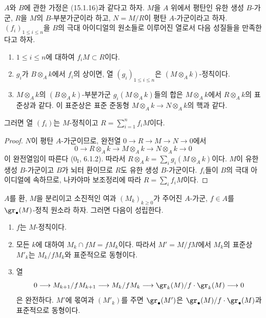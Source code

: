 \begin{corollary}[15.1.17]
\label{0.15.1.17-fr}
$A$와 $B$에 관한 가정은 (15.1.16)과 같다고 하자. $M$을 $A$ 위에서
평탄인 유한 생성 $B$-가군, $R$을 $M$의 $B$-부분가군이라 하고,
$N=M/R$이 평탄 $A$-가군이라고 하자. $(f_i)_{1\leq i\leq n}$을
$B$의 극대 아이디얼의 원소들로 이루어진 열로서 다음 성질들을
만족한다고 하자.
\begin{enumerate}
  \item[(i)] $1\leq i\leq n$에 대하여 $f_iM\subset R$이다.
  \item[(ii)] $g_i$가 $B\otimes_A k$에서 $f_i$의 상이면, 열
  $(g_i)_{1\leq i\leq n}$은 $(M\otimes_A k)$-정칙이다.
  \item[(iii)] $M\otimes_A k$의 $(B\otimes_A k)$-부분가군
  $g_i(M\otimes_A k)$들의 합은 $M\otimes_A k$에서
  $R\otimes_A k$의 표준상과 같다. 이 표준상은 표준 준동형
  $M\otimes_A k\to N\otimes_A k$의 핵과 같다.
\end{enumerate}
그러면 열 $(f_i)$는 $M$-정칙이고
$R=\sum_{i=1}^n f_iM$이다.
\end{corollary}

\begin{proof}
$N$이 평탄 $A$-가군이므로, 완전열 $0\to R\to M\to N\to0$에서
\[
  0\longrightarrow R\otimes_A k\longrightarrow M\otimes_A k
  \longrightarrow N\otimes_A k\longrightarrow0
\]
이 완전열임이 따른다 ($0_{\mathrm I}$, 6.1.2). 따라서
$R\otimes_A k=\sum_i g_i(M\otimes_A k)$이다. $M$이 유한 생성
$B$-가군이고 $B$가 뇌터 환이므로 $R$도 유한 생성 $B$-가군이다.
$f_i$들이 $B$의 극대 아이디얼에 속하므로, 나카야마 보조정리에 따라
$R=\sum_i f_iM$이다.
\end{proof}

\begin{lemma}[15.1.18]
\label{0.15.1.18-fr}
$A$를 환, $M$을 분리이고 소진적인 여과 $(M_k)_{k\geq0}$가 주어진
$A$-가군, $f\in A$를 $\gr_\bullet(M)$-정칙 원소라 하자. 그러면
다음이 성립한다.
\begin{enumerate}
  \item[(i)] $f$는 $M$-정칙이다.
  \item[(ii)] 모든 $k$에 대하여 $M_k\cap fM=fM_k$이다. 따라서
  $M'=M/fM$에서 $M_k$의 표준상 $M'_k$는 $M_k/fM_k$와 표준적으로
  동형이다.
  \item[(iii)] 열
  \[
    0\longrightarrow M_{k+1}/fM_{k+1}\longrightarrow M_k/fM_k
    \longrightarrow\gr_k(M)/f\cdot\gr_k(M)\longrightarrow0
  \]
  은 완전하다. $M'$에 몫여과 $(M'_k)$를 주면
  $\gr_\bullet(M')$은
  $\gr_\bullet(M)/f\cdot\gr_\bullet(M)$과 표준적으로 동형이다.
\end{enumerate}
\end{lemma}

